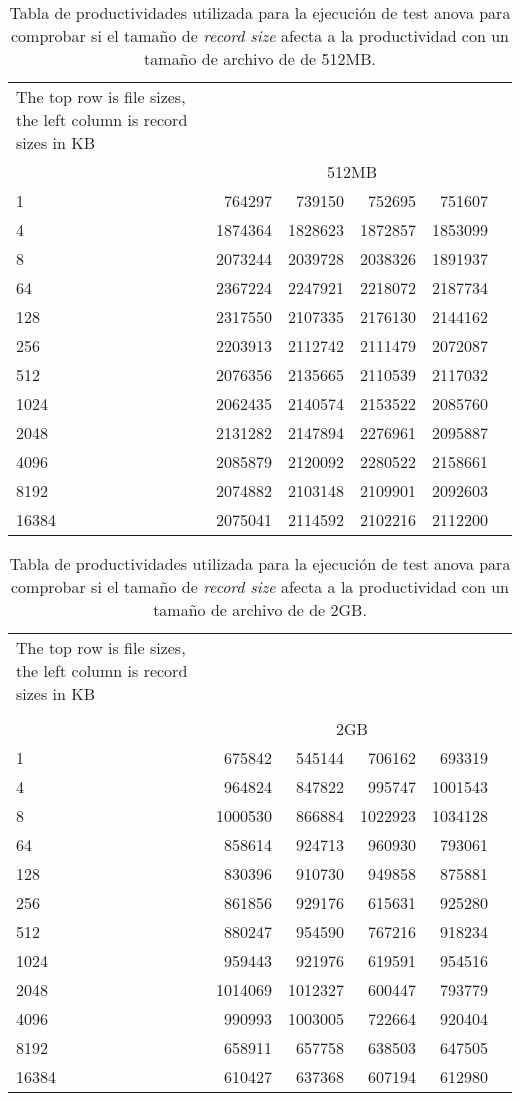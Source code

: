 \begin{table}[!htp]\centering
\caption{Tabla de productividades utilizada para la ejecución de test anova para comprobar si el tamaño de \textit{record size} afecta a la productividad con un tamaño de archivo de de 512MB.}
\scriptsize
\begin{tabular}{lrrrrr}\toprule
The top row is file sizes, the left column is record sizes in KB & & & & \\
&\multicolumn{4}{c}{512MB} \\\midrule
1 &764297 &739150 &752695 &751607 \\
4 &1874364 &1828623 &1872857 &1853099 \\
8 &2073244 &2039728 &2038326 &1891937 \\
64 &2367224 &2247921 &2218072 &2187734 \\
128 &2317550 &2107335 &2176130 &2144162 \\
256 &2203913 &2112742 &2111479 &2072087 \\
512 &2076356 &2135665 &2110539 &2117032 \\
1024 &2062435 &2140574 &2153522 &2085760 \\
2048 &2131282 &2147894 &2276961 &2095887 \\
4096 &2085879 &2120092 &2280522 &2158661 \\
8192 &2074882 &2103148 &2109901 &2092603 \\
16384 &2075041 &2114592 &2102216 &2112200 \\
\bottomrule
\end{tabular}
\end{table}

\begin{table}[H]\centering
\caption{Tabla de productividades utilizada para la ejecución de test anova para comprobar si el tamaño de \textit{record size} afecta a la productividad con un tamaño de archivo de de 2GB.}
\scriptsize
\begin{tabular}{lrrrrr}\toprule
The top row is file sizes, the left column is record sizes in KB & & & & \\
& & & & \\
&\multicolumn{4}{c}{2GB} \\\midrule
1 &675842 &545144 &706162 &693319 \\
4 &964824 &847822 &995747 &1001543 \\
8 &1000530 &866884 &1022923 &1034128 \\
64 &858614 &924713 &960930 &793061 \\
128 &830396 &910730 &949858 &875881 \\
256 &861856 &929176 &615631 &925280 \\
512 &880247 &954590 &767216 &918234 \\
1024 &959443 &921976 &619591 &954516 \\
2048 &1014069 &1012327 &600447 &793779 \\
4096 &990993 &1003005 &722664 &920404 \\
8192 &658911 &657758 &638503 &647505 \\
16384 &610427 &637368 &607194 &612980 \\
\bottomrule
\end{tabular}
\end{table}

